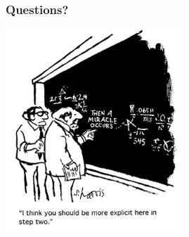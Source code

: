 \documentclass[xcolor=x11names,compress]{beamer}
\renewcommand{\(}{\begin{columns}}
\renewcommand{\)}{\end{columns}}
\newcommand{\<}[1]{\begin{column}{#1}}
\renewcommand{\>}{\end{column}}
\begin{document}
\section*{}
\begin{frame}[fragile]
  \frametitle{Questions?}
  \begin{center}
  \includegraphics[height=3in,clip]{../Class1/math07}  
  \end{center}
  
\end{frame}
\end{document}
